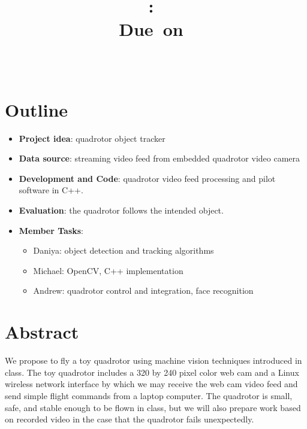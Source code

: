 \documentclass{article}
\title{\vspace{2in}\textmd{\textbf{\hmwkClass:\ \hmwkTitle}}\\\normalsize\vspace{0.1in}\small{Due\ on\ \hmwkDueDate}\\\vspace{0.1in}\large{\textit{\hmwkClassInstructor\ \hmwkClassTime}}\vspace{3in}}
\date{}
\author{\textbf{\hmwkAuthorName}}
\begin{document}
\begin{spacing}{1.1}
\maketitle
\newpage


\clearpage
\section{Outline}
\begin{itemize}
\item \textbf{Project idea}: quadrotor object tracker
\item \textbf{Data source}: streaming video feed from
  embedded quadrotor video camera
\item \textbf{Development and Code}: quadrotor video feed
  processing and pilot software in C++.
\item \textbf{Evaluation}: the quadrotor follows the
  intended object.
\item \textbf{Member Tasks}: 
  \begin{itemize}
  \item Daniya: object detection and tracking algorithms
  \item Michael: OpenCV, C++ implementation
  \item Andrew: quadrotor control and integration, face recognition
  \end{itemize}
\end{itemize}

\section{Abstract}
We propose to fly a toy quadrotor using machine vision techniques
introduced in class. The toy quadrotor includes a 320 by 240 pixel
color web cam and a Linux wireless network interface by which we may
receive the web cam video feed and send simple flight commands from a
laptop computer. The quadrotor is small, safe, and stable enough to be
flown in class, but we will also prepare work based on recorded video
in the case that the quadrotor fails unexpectedly.


\end{spacing}
\end{document}
